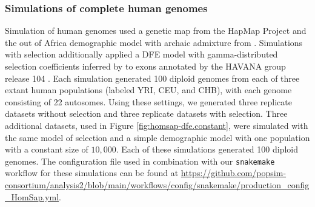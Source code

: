 \documentclass[hidelinks]{article}
\newcommand{\stdpopsim}{\texttt{stdpopsim}\xspace}
\newcommand{\snakemake}{\texttt{snakemake}\xspace}
\begin{document}
    \subsubsection*{Simulations of complete human genomes}
    Simulation of human genomes used a genetic map from the HapMap Project
    \citep[\stdpopsim label \texttt{HapMapII\_GRCh38}]{international2007second}  and
    the out of Africa demographic model with archaic admixture from
    \citet[\stdpopsim label \texttt{OutOfAfricaArchaicAdmixture\_5R19}]{ragsdale2019models}.
    Simulations with selection additionally applied a DFE model with gamma-distributed selection coefficients inferred by
    \citet[\stdpopsim label \texttt{Gamma\_K17}]{kim2017inference}  to exons annotated by the HAVANA group release 104
    \citep[\stdpopsim label \texttt{ensembl\_havana\_104\_exons}]{ensembl2018}.
    Each simulation generated 100 diploid genomes from each of three extant human populations (labeled YRI, CEU, and CHB),
    with each genome consisting of 22 autosomes.
    Using these settings, we generated three replicate datasets without selection
    and three replicate datasets with selection.
    Three additional datasets, used in Figure \ref{fig:homsap-dfe.constant},
    were simulated with the same model of selection and a simple demographic model with one population with a constant size of $10,000$.
    Each of these simulations generated 100 diploid genomes.
    The configuration file used in combination with our \snakemake workflow
    for these simulations can be found at \url{https://github.com/popsim-consortium/analysis2/blob/main/workflows/config/snakemake/production_config_HomSap.yml}.
    
\end{document}

